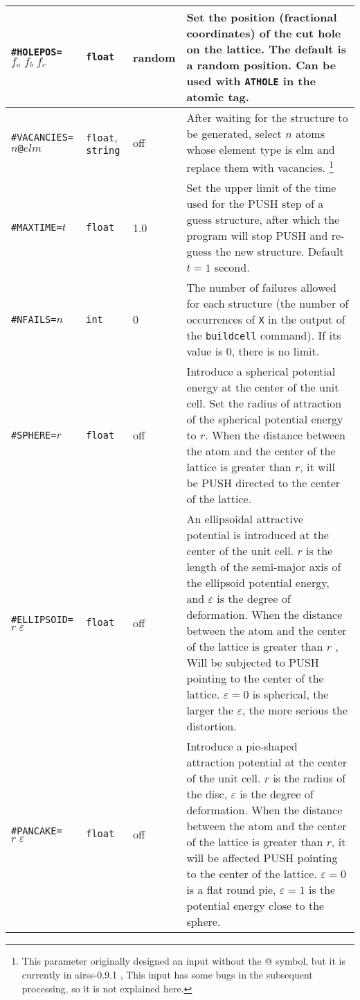 \documentclass[a4paper, 10pt]{article}
\begin{document}
\begin{center}
\begin{longtable}{m{11em}|m{4em}<{\centering}|m{3em}<{\centering}|m{15em}}
\midrule
\verb|#HOLEPOS=|\(f_a\;f_b\;f_c\) & \verb|float| & random & Set the position (fractional coordinates) of the cut hole on the lattice. The default is a random position. Can be used with \verb|ATHOLE| in the atomic tag.\\
\midrule
\verb|#VACANCIES=|\(n\)\verb|@|\(elm\)& \verb|float|, \verb|string| & off & After waiting for the structure to be generated, select \(n\) atoms whose element type is elm and replace them with vacancies. \footnote{This parameter originally designed an input without the @ symbol, but it is currently in airss-0.9.1 , This input has some bugs in the subsequent processing, so it is not explained here.}\\
\midrule
\verb|#MAXTIME=|\(t\)& \verb|float| & 1.0 & Set the upper limit of the time used for the PUSH step of a guess structure, after which the program will stop PUSH and re-guess the new structure. Default \(t=1\) second.\\
\midrule
\verb|#NFAILS=|\(n\)& \verb|int| & 0 & The number of failures allowed for each structure (the number of occurrences of \verb|X| in the output of the \verb|buildcell| command). If its value is 0, there is no limit.\\
\midrule
\verb|#SPHERE=|\(r\) & \verb|float| & off & Introduce a spherical potential energy at the center of the unit cell. Set the radius of attraction of the spherical potential energy to \(r\). When the distance between the atom and the center of the lattice is greater than \(r\), it will be PUSH directed to the center of the lattice.\\
\midrule
\verb|#ELLIPSOID=|\(r\;\varepsilon\) & \verb|float|  & off & An ellipsoidal attractive potential is introduced at the center of the unit cell. \(r\) is the length of the semi-major axis of the ellipsoid potential energy, and \(\varepsilon\) is the degree of deformation. When the distance between the atom and the center of the lattice is greater than \(r\) , Will be subjected to PUSH pointing to the center of the lattice. \(\varepsilon=0\) is spherical, the larger the \(\varepsilon\), the more serious the distortion. \\
\midrule
\verb|#PANCAKE=|\(r\;\varepsilon\) & \verb|float|  & off & Introduce a pie-shaped attraction potential at the center of the unit cell. \(r\) is the radius of the disc, \(\varepsilon\) is the degree of deformation. When the distance between the atom and the center of the lattice is greater than \(r\), it will be affected PUSH pointing to the center of the lattice. \(\varepsilon=0\) is a flat round pie, \(\varepsilon=1\) is the potential energy close to the sphere. \\

\end{longtable}
\end{center}
\end{document}
